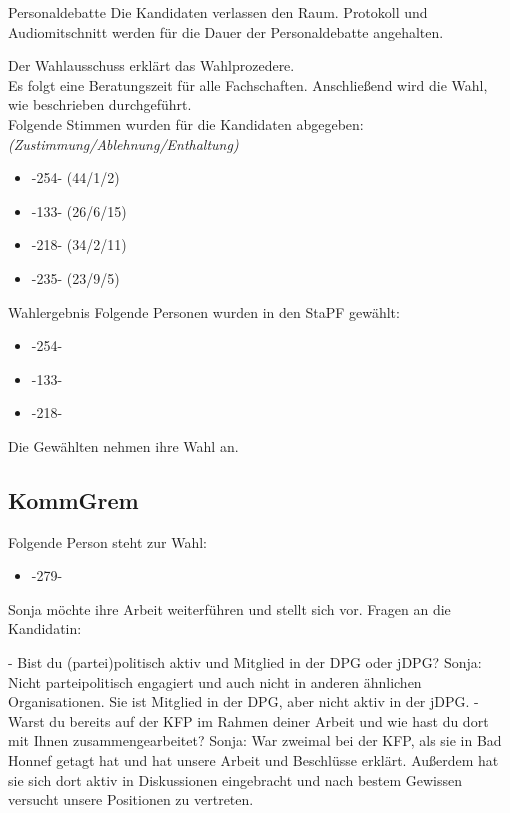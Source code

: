    \begin{info}{Personaldebatte}
      Die Kandidaten verlassen den Raum. Protokoll und Audiomitschnitt werden für die Dauer der Personaldebatte angehalten.
    \end{info}

    Der Wahlausschuss erklärt das Wahlprozedere. \\
    Es folgt eine Beratungszeit für alle Fachschaften. Anschließend wird die Wahl, wie beschrieben durchgeführt. \\

    Folgende Stimmen wurden für die Kandidaten abgegeben: \textit{(Zustimmung/Ablehnung/Enthaltung)}
    \begin{itemize}
      \item -254- (44/1/2)
      \item -133- (26/6/15)
      \item -218- (34/2/11)
      \item -235- (23/9/5)
    \end{itemize}

    \begin{success}{Wahlergebnis}
      Folgende Personen wurden in den StaPF gewählt:
        \begin{itemize}
          \item -254-
          \item -133-
          \item -218-
        \end{itemize}
        \tcblower
        Die Gewählten nehmen ihre Wahl an.
    \end{success}

  \subsection{KommGrem}
    Folgende Person steht zur Wahl:
    \begin{itemize}
      \item -279-
    \end{itemize}
    Sonja möchte ihre Arbeit weiterführen und stellt sich vor.
    Fragen an die Kandidatin:
    \begin{outline}
      - Bist du (partei)politisch aktiv und Mitglied in der DPG oder jDPG?
        \2 Sonja: Nicht parteipolitisch engagiert und auch nicht in anderen ähnlichen Organisationen. Sie ist Mitglied in der DPG, aber nicht aktiv in der jDPG.
      - Warst du bereits auf der KFP im Rahmen deiner Arbeit und wie hast du dort mit Ihnen zusammengearbeitet?
        \2 Sonja: War zweimal bei der KFP, als sie in Bad Honnef getagt hat und hat unsere Arbeit und Beschlüsse erklärt. Außerdem hat sie sich dort aktiv in Diskussionen eingebracht und nach bestem Gewissen versucht unsere Positionen zu vertreten.
    \end{outline}

